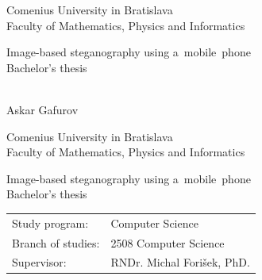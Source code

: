 \documentclass[12pt, oneside]{book}
\def\mfrok{2016}
\def\mfnazov{Image-based steganography using a~mobile~phone}
\def\mftyp{Bachelor's thesis}
\def\mfautor{Askar Gafurov}
\def\mfskolitel{RNDr. Michal Forišek, PhD.}
\def\mfkonzultant{tit. Meno Priezvisko, tit. }
\def\mfodbor{2508 Computer Science}
\def\program{ Computer Science }
\def\mfpracovisko{ Department of Computer Science }
\begin{document}
     

\thispagestyle{empty}

\begin{center}
\sc\large
Comenius University in Bratislava\\
Faculty of Mathematics, Physics and Informatics


\vfill

{\LARGE\mfnazov}\\
\mftyp
\end{center}

\vfill

{\sc\large 
\noindent \mfrok\\
\mfautor
}

\eject %


\thispagestyle{empty}
\noindent

\begin{center}
\sc  
\large
Comenius University in Bratislava\\
Faculty of Mathematics, Physics and Informatics

\vfill

{\LARGE\mfnazov}\\
\mftyp
\end{center}

\vfill

\noindent
\begin{tabular}{ll}
Study program: & \program \\
Branch of studies: & \mfodbor \\
Supervisor: & \mfskolitel \\
\end{tabular}

\vfill
\end{document}
